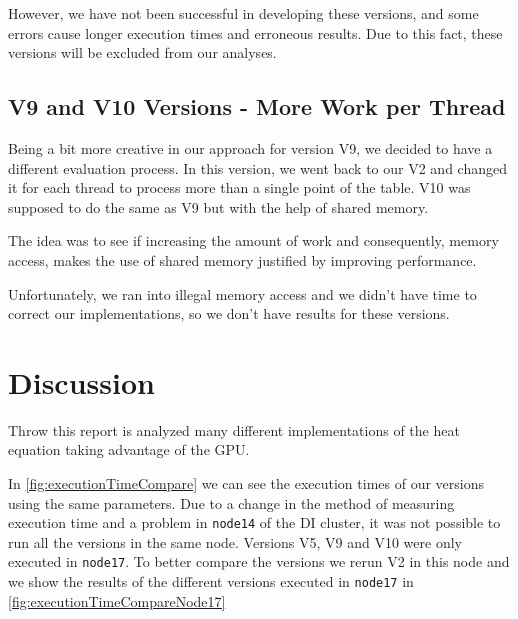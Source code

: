 \documentclass[conference]{IEEEtran}
\begin{document}
However, we have not been successful in developing these versions, and some errors cause longer execution times and erroneous results. Due to this fact, these versions will be excluded from our analyses.


\subsection{V9 and V10 Versions - More Work per Thread}
Being a bit more creative in our approach for version V9, we decided to have a different evaluation process. In this version, we went back to our V2 and changed it for each thread to process more than a single point of the table. V10 was supposed to do the same as V9 but with the help of shared memory.

The idea was to see if increasing the amount of work and consequently, memory access, makes the use of shared memory justified by improving performance.

Unfortunately, we ran into illegal memory access and we didn't have time to correct our implementations, so we don't have results for these versions.




\section{Discussion}

Throw this report is analyzed many different implementations of the heat equation taking advantage of the GPU.

In \autoref{fig:executionTimeCompare} we can see the execution times of our versions using the same parameters.
Due to a change in the method of measuring execution time and a problem in \texttt{node14} of the DI cluster, it was not possible to run all the versions in the same node. Versions V5, V9 and V10 were only executed in \texttt{node17}. To better compare the versions we rerun V2 in this node and we show the results of the different versions executed in \texttt{node17} in \autoref{fig:executionTimeCompareNode17}
\end{document}
